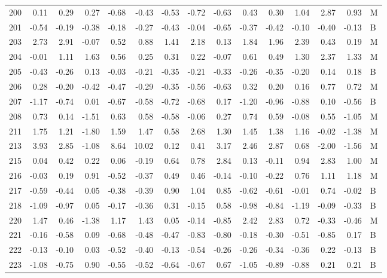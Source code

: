 \begin{table}[ht]
\begin{tabular}{rrrrrrrrrrrrrrl}
  200 & 0.11 & 0.29 & 0.27 & -0.68 & -0.43 & -0.53 & -0.72 & -0.63 & 0.43 & 0.30 & 1.04 & 2.87 & 0.93 & M \\ 
  201 & -0.54 & -0.19 & -0.38 & -0.18 & -0.27 & -0.43 & -0.04 & -0.65 & -0.37 & -0.42 & -0.10 & -0.40 & -0.13 & B \\ 
  203 & 2.73 & 2.91 & -0.07 & 0.52 & 0.88 & 1.41 & 2.18 & 0.13 & 1.84 & 1.96 & 2.39 & 0.43 & 0.19 & M \\ 
  204 & -0.01 & 1.11 & 1.63 & 0.56 & 0.25 & 0.31 & 0.22 & -0.07 & 0.61 & 0.49 & 1.30 & 2.37 & 1.33 & M \\ 
  205 & -0.43 & -0.26 & 0.13 & -0.03 & -0.21 & -0.35 & -0.21 & -0.33 & -0.26 & -0.35 & -0.20 & 0.14 & 0.18 & B \\ 
  206 & 0.28 & -0.20 & -0.42 & -0.47 & -0.29 & -0.35 & -0.56 & -0.63 & 0.32 & 0.20 & 0.16 & 0.77 & 0.72 & M \\ 
  207 & -1.17 & -0.74 & 0.01 & -0.67 & -0.58 & -0.72 & -0.68 & 0.17 & -1.20 & -0.96 & -0.88 & 0.10 & -0.56 & B \\ 
  208 & 0.73 & 0.14 & -1.51 & 0.63 & 0.58 & -0.58 & -0.06 & 0.27 & 0.74 & 0.59 & -0.08 & 0.55 & -1.05 & M \\ 
  211 & 1.75 & 1.21 & -1.80 & 1.59 & 1.47 & 0.58 & 2.68 & 1.30 & 1.45 & 1.38 & 1.16 & -0.02 & -1.38 & M \\ 
  213 & 3.93 & 2.85 & -1.08 & 8.64 & 10.02 & 0.12 & 0.41 & 3.17 & 2.46 & 2.87 & 0.68 & -2.00 & -1.56 & M \\ 
  215 & 0.04 & 0.42 & 0.22 & 0.06 & -0.19 & 0.64 & 0.78 & 2.84 & 0.13 & -0.11 & 0.94 & 2.83 & 1.00 & M \\ 
  216 & -0.03 & 0.19 & 0.91 & -0.52 & -0.37 & 0.49 & 0.46 & -0.14 & -0.10 & -0.22 & 0.76 & 1.11 & 1.18 & M \\ 
  217 & -0.59 & -0.44 & 0.05 & -0.38 & -0.39 & 0.90 & 1.04 & 0.85 & -0.62 & -0.61 & -0.01 & 0.74 & -0.02 & B \\ 
  218 & -1.09 & -0.97 & 0.05 & -0.17 & -0.36 & 0.31 & -0.15 & 0.58 & -0.98 & -0.84 & -1.19 & -0.09 & -0.33 & B \\ 
  220 & 1.47 & 0.46 & -1.38 & 1.17 & 1.43 & 0.05 & -0.14 & -0.85 & 2.42 & 2.83 & 0.72 & -0.33 & -0.46 & M \\ 
  221 & -0.16 & -0.58 & 0.09 & -0.68 & -0.48 & -0.47 & -0.83 & -0.80 & -0.18 & -0.30 & -0.51 & -0.85 & 0.17 & B \\ 
  222 & -0.13 & -0.10 & 0.03 & -0.52 & -0.40 & -0.13 & -0.54 & -0.26 & -0.26 & -0.34 & -0.36 & 0.22 & -0.13 & B \\ 
  223 & -1.08 & -0.75 & 0.90 & -0.55 & -0.52 & -0.64 & -0.67 & 0.67 & -1.05 & -0.89 & -0.88 & 0.21 & 0.21 & B \\ 

\end{tabular}
\end{table}
